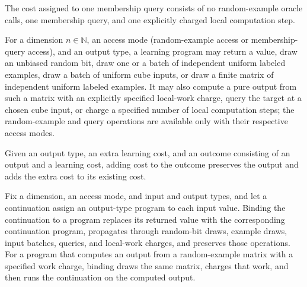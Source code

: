 \begin{definition}
\label{FABL.LearningCost.query}
\leanok
{}
The cost assigned to one membership query consists of no random-example oracle calls,
one membership query, and one explicitly charged local computation step.
\end{definition}

\begin{definition}
\label{FABL.LearningProgram}
\leanok
{}
For a dimension $n\in\mathbb{N}$, an access mode (random-example access or
membership-query access), and an output type, a learning program may return a value,
draw an unbiased random bit, draw one or a batch of independent uniform labeled
examples, draw a batch of uniform cube inputs, or draw a finite matrix of independent
uniform labeled examples. It may also compute a pure output from such a matrix with an
explicitly specified local-work charge, query the target at a chosen cube input, or
charge a specified number of local computation steps; the random-example and query
operations are available only with their respective access modes.
\end{definition}

\begin{definition}
\label{FABL.LearningProgram.addOutcomeCost}
\leanok
{}
Given an output type, an extra learning cost, and an outcome consisting of an output and
a learning cost, adding cost to the outcome preserves the output and adds the extra cost
to its existing cost.
\end{definition}

\begin{definition}
\label{FABL.LearningProgram.bind}
\leanok
{}
Fix a dimension, an access mode, and input and output types, and let a continuation
assign an output-type program to each input value. Binding the continuation to a program
replaces its returned value with the corresponding continuation program, propagates
through random-bit draws, example draws, input batches, queries, and local-work charges,
and preserves those operations. For a program that computes an output from a
random-example matrix with a specified work charge, binding draws the same matrix,
charges that work, and then runs the continuation on the computed output.
\end{definition}

